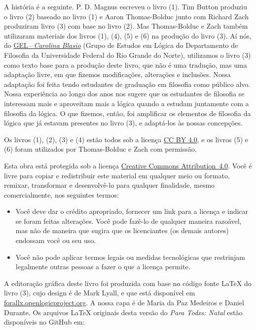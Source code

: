 \noindent A história é a seguinte.
P. D. Magnus escreveu o livro (1). Tim Button produziu o livro (2) baseado no livro (1) e Aaron Thomas-Bolduc junto com Richard Zach produziram  livro (3) com base no livro (2).
Mas Thomas-Bolduc e Zach também utilizaram materiais dos livros (1), (4), (5) e (6) na produção do livro (3).
Aí nós, do \href{https://gelogica.weebly.com/}{GEL\,--\,\textit{Carolina Blasio}} (Grupo de Estudos em Lógica do Departamento de Filosofia da Universidade Federal do Rio Grande do Norte), 
utilizamos o livro (3) como texto base para a produção deste livro, que não é uma tradução, mas uma adaptação livre, em que fizemos modificações, alterações e inclusões.
Nossa adaptação foi feita tendo estudantes de graduação em filosofia como público alvo.
Nossa experiência ao longo dos anos nos sugere que  os estudantes de filosofia se interessam mais e aproveitam mais a lógica quando a estudam juntamente com a filosofia da lógica.
O que fizemos, então, foi amplificar os elementos de filosofia da lógica que já estavam presentes no livro (3), e adaptá-los às nossas concepções.

Os livros (1), (2), (3) e (4) estão todos sob a licença \href{https://creativecommons.org/licenses/by/4.0/}{CC BY 4.0}, e os livros (5) e (6) foram utilizados por Thomas-Bolduc e Zach com permissão.\label{cc4by}




Esta obra está protegida sob a licença \href{https://creativecommons.org/licenses/by/4.0/}{Creative Commons \hbox{Attribution 4.0}}. 
Você é livre para copiar e redistribuir este material em qualquer meio ou formato, remixar, transformar e desenvolvê-lo para qualquer finalidade, mesmo comercialmente, nos seguintes termos:
\begin{itemize}
\item Você deve dar o crédito apropriado, fornecer um link para a licença e indicar se foram feitas alterações. Você pode fazê-lo de qualquer maneira razoável, mas não de maneira que sugira que os licenciantes (os demais autores) endossam você ou seu uso.
\item Você não pode aplicar termos legais ou medidas tecnológicas que restrinjam legalmente outras pessoas a fazer o que a licença permite.
\end{itemize}

\noindent A editoração gráfica deste livro foi produzida com base no código fonte \LaTeX{} do livro (3), cujo design é de Mark Lyall, e que está disponível em \hbox{\href{https://forallx.openlogicproject.org}{forallx.openlogicproject.org}}.
A nossa capa é de Maria da Paz Medeiros e Daniel Durante.
Os arquivos  \LaTeX{} originais desta versão do \textit{Para Todxs: Natal} estão disponíveis no GitHub em:

